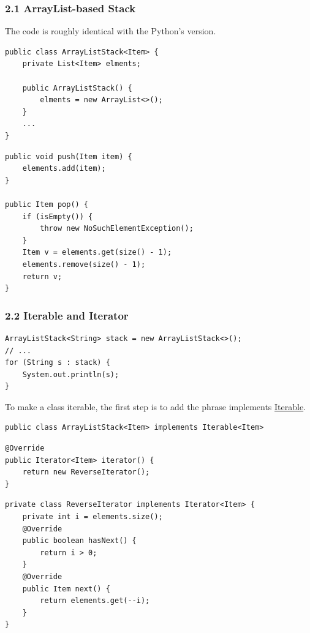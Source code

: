 \documentclass[aspectratio=169, 14pt]{beamer}
\begin{document}
\begin{frame}[fragile]
    \frametitle{2.1 ArrayList-based Stack}
    The code is roughly identical with the Python's version.
    \begin{verbatim}
public class ArrayListStack<Item> {
    private List<Item> elments;

    public ArrayListStack() {
        elments = new ArrayList<>();
    }
    ...
}
    \end{verbatim}
\end{frame}

\begin{frame}[fragile]
    \begin{verbatim}
public void push(Item item) {
    elements.add(item);
}

public Item pop() {
    if (isEmpty()) {
        throw new NoSuchElementException();
    }
    Item v = elements.get(size() - 1);
    elements.remove(size() - 1);
    return v;
}
    \end{verbatim}
\end{frame}

\begin{frame}[fragile]
    \frametitle{2.2 Iterable and Iterator}
    \begin{verbatim}
ArrayListStack<String> stack = new ArrayListStack<>();
// ...
for (String s : stack) {
    System.out.println(s);
}    
    \end{verbatim}
To make a class iterable, the first step is to add the phrase implements \href{https://docs.oracle.com/en/java/javase/11/docs/api/java.base/java/lang/Iterable.html}{Iterable}.

\begin{verbatim}
public class ArrayListStack<Item> implements Iterable<Item>
\end{verbatim}
\end{frame}

\begin{frame}[fragile]

\begin{verbatim}
@Override
public Iterator<Item> iterator() {
    return new ReverseIterator();
}
\end{verbatim}

\begin{verbatim}
private class ReverseIterator implements Iterator<Item> {
    private int i = elements.size();
    @Override
    public boolean hasNext() {
        return i > 0;
    }
    @Override
    public Item next() {
        return elements.get(--i);
    }
}
\end{verbatim}
\end{frame}
\end{document}

